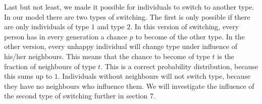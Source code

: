 Last but not least, we made it possible for individuals to switch to another type.
In our model there are two types of switching.
The first is only possible if there are only individuals of type $1$ and type $2$.
In this version of switching, every person has in every generation a chance $p$ to become of the other type.
In the other version, every unhappy individual will change type under influence of his/her neighbours.
This means that the chance to become of type $t$ is the fraction of neighbours of type $t$.
This is a correct probability distribution, because this sums up to $1$.
Individuals without neighbours will not switch type, because they have no neighbours who influence them.
We will investigate the influence of the second type of switching further in section $7$.


